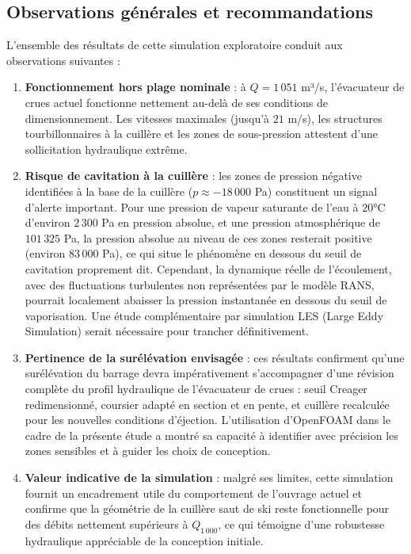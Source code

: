 \subsection{Observations générales et recommandations}
\label{subsec:q1051_discussion}

L'ensemble des résultats de cette simulation exploratoire conduit aux observations suivantes :

\begin{enumerate}
    \item \textbf{Fonctionnement hors plage nominale} : à $Q = 1\,051$ m³/s, l'évacuateur de crues actuel fonctionne nettement au-delà de ses conditions de dimensionnement. Les vitesses maximales (jusqu'à $21$ m/s), les structures tourbillonnaires à la cuillère et les zones de sous-pression attestent d'une sollicitation hydraulique extrême.

    \item \textbf{Risque de cavitation à la cuillère} : les zones de pression négative identifiées à la base de la cuillère ($p \approx -18\,000$ Pa) constituent un signal d'alerte important. Pour une pression de vapeur saturante de l'eau à $20°$C d'environ $2\,300$ Pa en pression absolue, et une pression atmosphérique de $101\,325$ Pa, la pression absolue au niveau de ces zones resterait positive (environ $83\,000$ Pa), ce qui situe le phénomène en dessous du seuil de cavitation proprement dit. Cependant, la dynamique réelle de l'écoulement, avec des fluctuations turbulentes non représentées par le modèle RANS, pourrait localement abaisser la pression instantanée en dessous du seuil de vaporisation. Une étude complémentaire par simulation LES (Large Eddy Simulation) serait nécessaire pour trancher définitivement.

    \item \textbf{Pertinence de la surélévation envisagée} : ces résultats confirment qu'une surélévation du barrage devra impérativement s'accompagner d'une révision complète du profil hydraulique de l'évacuateur de crues : seuil Creager redimensionné, coursier adapté en section et en pente, et cuillère recalculée pour les nouvelles conditions d'éjection. L'utilisation d'OpenFOAM dans le cadre de la présente étude a montré sa capacité à identifier avec précision les zones sensibles et à guider les choix de conception.

    \item \textbf{Valeur indicative de la simulation} : malgré ses limites, cette simulation fournit un encadrement utile du comportement de l'ouvrage actuel et confirme que la géométrie de la cuillère saut de ski reste fonctionnelle pour des débits nettement supérieurs à $Q_{1\,000}$, ce qui témoigne d'une robustesse hydraulique appréciable de la conception initiale.
\end{enumerate}

